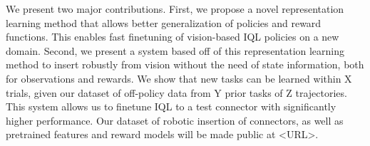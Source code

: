 \documentclass[letterpaper, 10 pt, conference, final]{ieeeconf}   %
\begin{document}
We present two major contributions.
First, we propose a novel representation learning method that allows better generalization of policies and reward functions.
This enables fast finetuning of vision-based IQL
policies on a new domain. 
Second, we present a system based off of this representation learning method to insert robustly from vision without the need of state information,
both for observations and rewards.
We show that new tasks can be learned within X trials, given our dataset of off-policy data from Y prior tasks of Z trajectories.
This system allows us to finetune IQL to a test connector with significantly higher performance.
Our dataset of robotic insertion of \numconnectors connectors, as well as pretrained features and reward models will be made public at <URL>.

\end{document}

